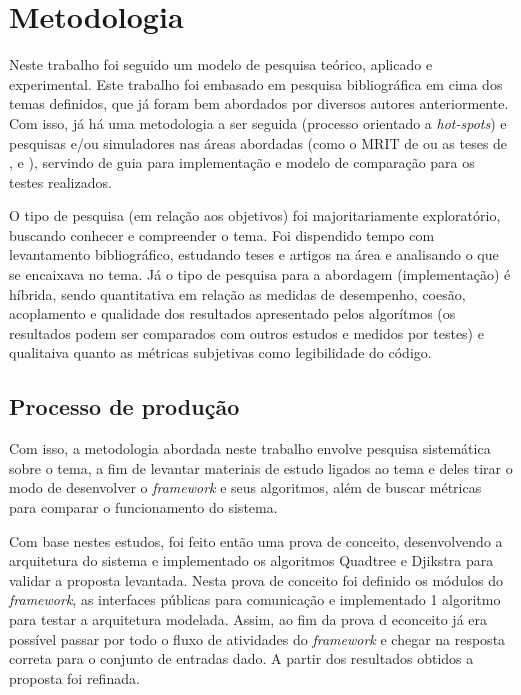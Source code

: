 \chapter[Metodologia]{Metodologia}

Neste trabalho foi seguido um modelo de pesquisa teórico, aplicado e experimental. Este trabalho foi embasado em pesquisa bibliográfica em cima dos temas definidos, que já foram bem abordados por diversos autores anteriormente. Com isso, já há uma metodologia a ser seguida (processo orientado a \textit{hot-spots}) e pesquisas e/ou simuladores nas áreas abordadas (como o MRIT de \cite{Guzman2008} ou as teses de \cite{Souza2008}, \cite{Thomsen2010} e \cite{Strandberg2004}), servindo de guia para implementação e modelo de comparação para os testes realizados.

O tipo de pesquisa (em relação aos objetivos) foi majoritariamente exploratório, buscando conhecer e compreender o tema. Foi dispendido tempo com levantamento bibliográfico, estudando teses e artigos na área e analisando o que se encaixava no tema. Já o tipo de pesquisa para a abordagem (implementação) é híbrida, sendo quantitativa em relação as medidas de desempenho, coesão, acoplamento e qualidade dos resultados apresentado pelos algorítmos (os resultados podem ser comparados com outros estudos e medidos por testes) e qualitaiva quanto as métricas subjetivas como legibilidade do código.

\section{Processo de produção}

Com isso, a metodologia abordada neste trabalho envolve pesquisa sistemática sobre o tema, a fim de levantar materiais de estudo ligados ao tema e deles tirar o modo de desenvolver o \textit{framework} e seus algoritmos, além de buscar métricas para comparar o funcionamento do sistema. 

Com base nestes estudos, foi feito então uma prova de conceito, desenvolvendo a arquitetura do sistema e implementado os algoritmos Quadtree e Djikstra para validar a proposta levantada. Nesta prova de conceito foi definido os módulos do \textit{framework}, as interfaces públicas para comunicação e implementado 1 algoritmo para testar a arquitetura modelada. Assim, ao fim da prova d econceito já era possível passar por todo o fluxo de atividades do \textit{framework} e chegar na resposta correta para o conjunto de entradas dado. A partir dos resultados obtidos a proposta foi refinada.

